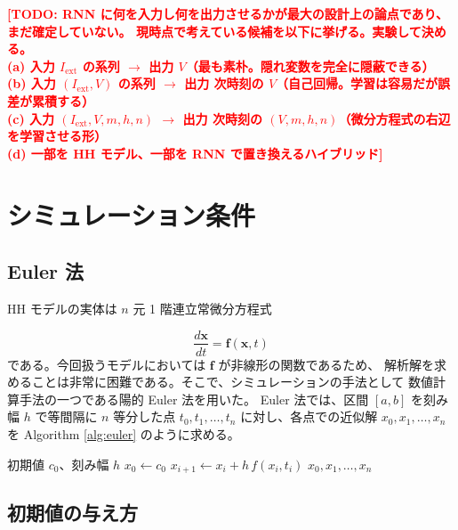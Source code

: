 \documentclass[a4paper,11pt,openany]{ltjsreport}
\newcommand{\TODO}[1]{\textcolor{red}{\textbf{[TODO: #1]}}}
\newcommand{\Iext}{I_{\mathrm{ext}}}
\begin{document}
\TODO{RNN に何を入力し何を出力させるかが最大の設計上の論点であり、まだ確定していない。
      現時点で考えている候補を以下に挙げる。実験して決める。\\
      (a) 入力 $\Iext$ の系列 $\to$ 出力 $V$（最も素朴。隠れ変数を完全に隠蔽できる）\\
      (b) 入力 $(\Iext, V)$ の系列 $\to$ 出力 次時刻の $V$（自己回帰。学習は容易だが誤差が累積する）\\
      (c) 入力 $(\Iext, V, m, h, n)$ $\to$ 出力 次時刻の $(V, m, h, n)$（微分方程式の右辺を学習させる形）\\
      (d) 一部を HH モデル、一部を RNN で置き換えるハイブリッド}

\section{シミュレーション条件}
\label{sec:sim_cond}

\subsection{Euler 法}

HH モデルの実体は $n$ 元 1 階連立常微分方程式

\begin{equation}
  \frac{d\bm{x}}{dt} = \bm{f}(\bm{x}, t)
  \label{eq:ode}
\end{equation}
である。今回扱うモデルにおいては $\bm{f}$ が非線形の関数であるため、
解析解を求めることは非常に困難である。そこで、シミュレーションの手法として
数値計算手法の一つである陽的 Euler 法を用いた。
Euler 法では、区間 $[a,b]$ を刻み幅 $h$ で等間隔に $n$ 等分した点
$t_0, t_1, \dots, t_n$ に対し、各点での近似解 $x_0, x_1, \dots, x_n$ を
Algorithm \ref{alg:euler} のように求める\cite{minemura2008}。

\begin{algorithm}[tbp]
  \caption{Euler 法}
  \label{alg:euler}
  \begin{algorithmic}[1]
    \Require 初期値 $c_0$、刻み幅 $h$
    \State $x_0 \gets c_0$
      \State $x_{i+1} \gets x_i + h\, f(x_i, t_i)$
    \EndFor
    \State \Return $x_0, x_1, \dots, x_n$
  \end{algorithmic}
\end{algorithm}

\subsection{初期値の与え方}
\end{document}

